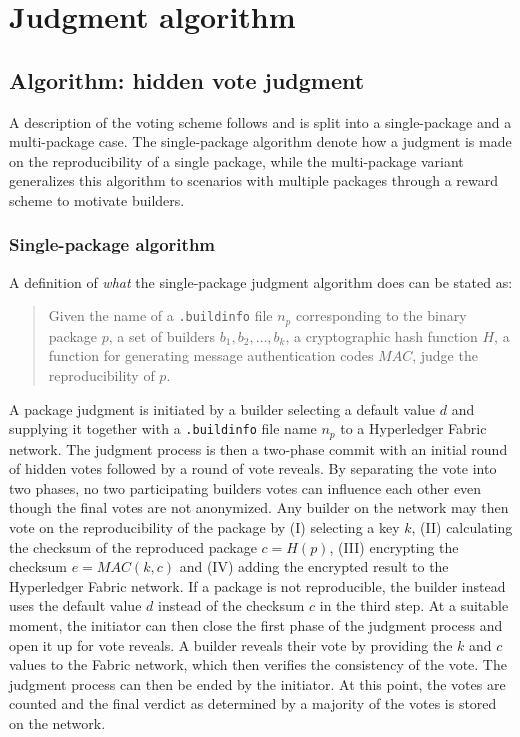 \chapter{Judgment algorithm}

\section{Algorithm: hidden vote judgment}

A description of the voting scheme follows and is split into a single-package and a multi-package case. The single-package algorithm denote how a judgment is made on the reproducibility of a single package, while the multi-package variant generalizes this algorithm to scenarios with multiple packages through a reward scheme to motivate builders.

\subsection{Single-package algorithm}
\label{subsec:AlgorithmSingle}

A definition of \textit{what} the single-package judgment algorithm does can be stated as:

\begin{quote}
	Given the name of a \texttt{.buildinfo} file $n_p$ corresponding to the binary package $p$, a set of builders $b_1, b_2, \dotsc, b_k$, a cryptographic hash function $H$, a function for generating message authentication codes $MAC$, judge the reproducibility of $p$.
\end{quote}

A package judgment is initiated by a builder selecting a default value $d$ and supplying it together with a \texttt{.buildinfo} file name $n_p$ to a Hyperledger Fabric network. The judgment process is then a two-phase commit with an initial round of hidden votes followed by a round of vote reveals. By separating the vote into two phases, no two participating builders votes can influence each other even though the final votes are not anonymized. Any builder on the network may then vote on the reproducibility of the package by (I) selecting a key $k$, (II) calculating the checksum of the reproduced package $c = H(p)$, (III) encrypting the checksum $e = MAC(k, c)$ and (IV) adding the encrypted result to the Hyperledger Fabric network. If a package is not reproducible, the builder instead uses the default value $d$ instead of the checksum $c$ in the third step. At a suitable moment, the initiator can then close the first phase of the judgment process and open it up for vote reveals. A builder reveals their vote by providing the $k$ and $c$ values to the Fabric network, which then verifies the consistency of the vote. The judgment process can then be ended by the initiator. At this point, the votes are counted and the final verdict as determined by a majority of the votes is stored on the network.


